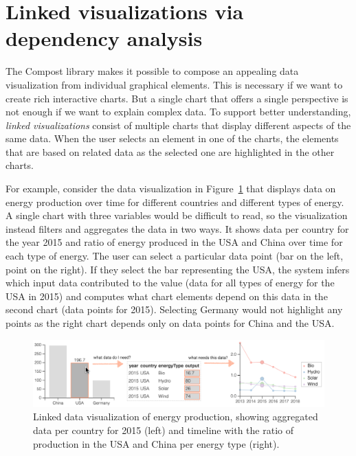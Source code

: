 \documentclass[fleqn,11pt]{report}
\theoremstyle{definition}
\begin{document}
\section{Linked visualizations via dependency analysis}

The Compost library makes it possible to compose an appealing data visualization
from individual graphical elements. This is necessary if we want to create rich interactive
charts. But a single chart that offers a single perspective is not enough if we want to
explain complex data. To support better understanding, \emph{linked visualizations}
consist of multiple charts that display different aspects of the same data. When the user
selects an element in one of the charts, the elements that are based on related data as the
selected one are highlighted in the other charts.

For example, consider the data visualization in Figure~\ref{fig:fluid} that displays data
on energy production over time for different countries and different types of energy.
A single chart with three variables would be difficult to read, so the visualization
instead filters and aggregates the data in two ways. It shows data per country for the year
2015 and ratio of energy produced in the USA and China over time for each type of energy.
The user can select a particular data point (bar on the left, point on the right). If they
select the bar representing the USA, the system infers which input data contributed to the
value (data for all types of energy for the USA in 2015) and computes what chart elements depend
on this data in the second chart (data points for 2015). Selecting Germany
would not highlight any points as the right chart depends only on data points for
China and the USA.

\begin{figure}[t]
  \hspace{-3em}\includegraphics[scale=0.7]{img/fluid.png}
  \caption{Linked data visualization of energy production, showing aggregated data per
  country for 2015 (left) and timeline with the ratio of production
  in the USA and China per energy type (right).}
  \label{fig:fluid}
\end{figure}
\end{document}
